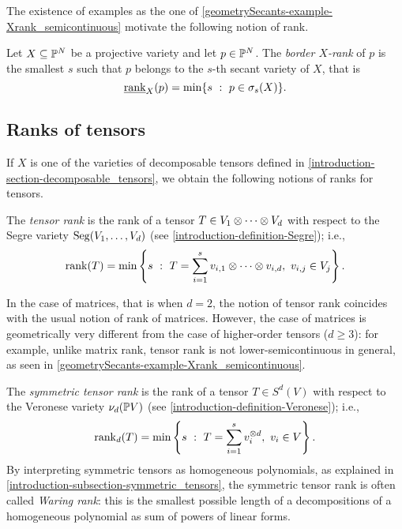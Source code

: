  The existence of examples as the one of \ref{geometrySecants-example-Xrank_semicontinuous} motivate the following notion of rank.

 \begin{definition}
     \label{geometrySecants-definition-border_rank}
     Let $X \subseteq \mathbb{P}^N$ be a projective variety and let $p \in \mathbb{P}^N$. The \emph{border $X$-rank} of $p$ is the smallest $s$ such that $p$ belongs to the $s$-th secant variety of $X$, that is 
     \[
         \underline{\mathrm{rank}}_X(p) = \min\{s ~:~ p \in \sigma_s(X)\}.
     \]
 \end{definition}
 
 
 \subsection{Ranks of tensors}
 If $X$ is one of the varieties of decomposable tensors defined in \ref{introduction-section-decomposable_tensors}, we obtain the following notions of ranks for tensors.
 
 \begin{definition}
 \label{geometrySecants-definition-tensor_rank}
     The \emph{tensor rank} is the rank of a tensor $T \in V_1 \otimes \cdots \otimes V_d$ with respect to the Segre variety $\mathrm{Seg}(V_1,\ldots,V_d)$ (see \ref{introduction-definition-Segre}); i.e., 
     \[
         \mathrm{rank}(T) = \min\left\{s ~:~ T = \sum_{i=1}^s v_{i,1}\otimes \cdots \otimes v_{i,d}, ~ v_{i,j} \in V_j\right\}.
     \]
 \end{definition}
\begin{example}
 \label{geometrySecants-example-tensor_rank}
In the case of matrices, that is when $d=2$, the notion of tensor rank coincides with the usual notion of rank of matrices. However, the case of matrices is geometrically very different from the case of higher-order tensors ($d\geq 3$): for example, unlike matrix rank, tensor rank is not lower-semicontinuous in general, as seen in \ref{geometrySecants-example-Xrank_semicontinuous}. 
\end{example}
 
 \begin{definition}
 \label{geometrySecants-definition-symmetric_tensor_rank}
     The \emph{symmetric tensor rank} is the rank of a tensor $T \in S^d(V)$ with respect to the Veronese variety $\nu_d(\mathbb{P} V)$ (see \ref{introduction-definition-Veronese}); i.e., 
     \[
         \mathrm{rank}_d(T) = \min\left\{s ~:~ T = \sum_{i=1}^s v_{i}^{\otimes d}, ~ v_{i} \in V\right\}.
     \]
     By interpreting symmetric tensors as homogeneous polynomials, as explained in \ref{introduction-subsection-symmetric_tensors}, the symmetric tensor rank is often called \emph{Waring rank}: this is the smallest possible length of a decompositions of a homogeneous polynomial as sum of powers of linear forms.
 \end{definition}  
 
